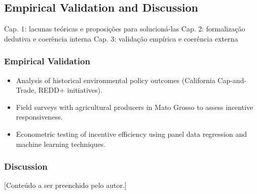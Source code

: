 \subsection{Empirical Validation and Discussion}

Cap. 1: lacunas teóricas e proposições para solucioná-las
Cap. 2: formalização dedutiva e coerência interna
Cap. 3: validação empírica e coerência externa

\subsubsection{Empirical Validation}
\begin{itemize}
    \item Analysis of historical environmental policy outcomes (California Cap-and-Trade, REDD+ initiatives).
    \item Field surveys with agricultural producers in Mato Grosso to assess incentive responsiveness.
    \item Econometric testing of incentive efficiency using panel data regression and machine learning techniques.
\end{itemize}

\subsubsection{Discussion}

[Conteúdo a ser preenchido pelo autor.]

\newpage

